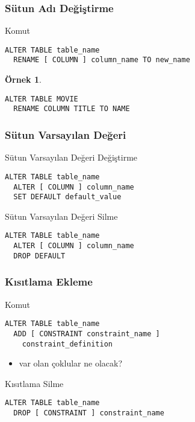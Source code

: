\documentclass[dvipsnames]{beamer}
\theoremstyle{definition}
\theoremstyle{example}
\newtheorem{ornek}[theorem]{Örnek}
\theoremstyle{plain}
\begin{document}
\begin{frame}[fragile]
  \frametitle{Sütun Adı Değiştirme}

  \begin{block}{Komut}
    \begin{lstlisting}
ALTER TABLE table_name
  RENAME [ COLUMN ] column_name TO new_name
    \end{lstlisting}
  \end{block}

  \pause
  \medskip
  \begin{ornek}
    \begin{lstlisting}
ALTER TABLE MOVIE
  RENAME COLUMN TITLE TO NAME
    \end{lstlisting}
  \end{ornek}
\end{frame}

\begin{frame}[fragile]
  \frametitle{Sütun Varsayılan Değeri}

  \begin{block}{Sütun Varsayılan Değeri Değiştirme}
    \begin{lstlisting}
ALTER TABLE table_name
  ALTER [ COLUMN ] column_name
  SET DEFAULT default_value
    \end{lstlisting}
  \end{block}

  \pause
  \begin{block}{Sütun Varsayılan Değeri Silme}
    \begin{lstlisting}
ALTER TABLE table_name
  ALTER [ COLUMN ] column_name
  DROP DEFAULT
    \end{lstlisting}
  \end{block}
  \medskip
\end{frame}

\begin{frame}[fragile]
  \frametitle{Kısıtlama Ekleme}

  \begin{block}{Komut}
    \begin{lstlisting}
ALTER TABLE table_name
  ADD [ CONSTRAINT constraint_name ]
    constraint_definition
    \end{lstlisting}
  \end{block}

  \pause
  \begin{itemize}
    \item var olan çoklular ne olacak?
  \end{itemize}

  \pause
  \begin{block}{Kısıtlama Silme}
    \begin{lstlisting}
ALTER TABLE table_name
  DROP [ CONSTRAINT ] constraint_name
    \end{lstlisting}
  \end{block}
\end{frame}
\end{document}
